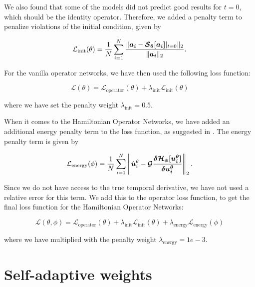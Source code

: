 We also found that some of the models did not predict good results for \(t=0\), which should be the identity operator. 
Therefore, we added a penalty term to penalize violations of the initial condition, given by

\begin{equation}
    \mathcal{L}_{\text{init}}(\theta) = \frac{1}{N} \sum_{i=1}^{N} \frac{\|\bm{a_i}- \bm{\mathcal{S}_\theta[a_i]}|_{t=0}\|_2}{\|\bm{a_i}\|_2}.
\end{equation}

For the vanilla operator networks, we have then used the following loss function:

\begin{equation}
    \mathcal{L}(\theta)=\mathcal{L}_{\text{operator}}(\theta)+ \lambda_{\text{init}} \mathcal{L}_{\text{init}}(\theta)
    \label{loss_with_init_penalty}
\end{equation}

where we have set the penalty weight \(\lambda_{\text{init}} = 0.5\).

When it comes to the Hamiltonian Operator Networks, we have added an additional energy penalty term to the loss function, as suggested in .
The energy penalty term is given by

\begin{equation}
    \mathcal{L}_{\text{energy}}(\phi)=\frac{1}{N} \sum_{i=1}^{N} \left\|\dot{\bm{u}}_i^\theta - \bm{\mathcal{G} \frac{\delta \mathcal{H}_\phi[u_i^\theta]}{\delta u_i^\theta}}\right\|_2.
    \label{energy_penalty}
\end{equation}

Since we do not have access to the true temporal derivative, we have not used a relative error for this term.
We add this to the operator loss function, to get the final loss function for the Hamiltonian Operator Networks:

\begin{equation}
    \mathcal{L}(\theta, \phi)=\mathcal{L}_{\text{operator}}(\theta)+ \lambda_{\text{init}} \mathcal{L}_{\text{init}}(\theta) + \lambda_{\text{energy}} \mathcal{L}_{\text{energy}}(\phi)
    \label{loss_with_init_penalty_hon}
\end{equation}

where we have multiplied with the penalty weight \(\lambda_{\text{energy}} = 1e-3\).

\section{Self-adaptive weights}

